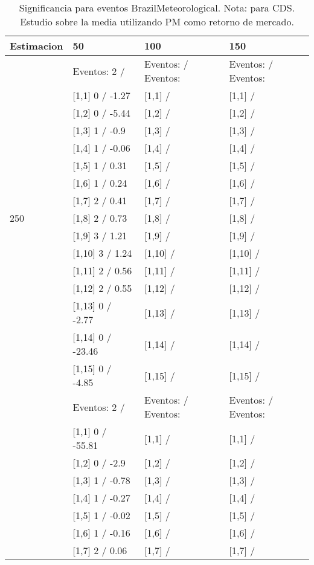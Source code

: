 \begin{table}

\caption{Significancia para eventos BrazilMeteorological. Nota: para CDS. Estudio sobre la media utilizando PM como retorno de mercado.}
\centering
\begin{tabular}[t]{llll}
\toprule
Estimacion & 50 & 100 & 150\\
\midrule
 & Eventos:  2 / & Eventos:   / Eventos: & Eventos:   / Eventos:\\
 & {}[1,1] 0  / -1.27 & {}[1,1]  / & {}[1,1]  /\\
 & {}[1,2] 0  / -5.44 & {}[1,2]  / & {}[1,2]  /\\
 & {}[1,3] 1  / -0.9 & {}[1,3]  / & {}[1,3]  /\\
 & {}[1,4] 1  / -0.06 & {}[1,4]  / & {}[1,4]  /\\
\addlinespace
 & {}[1,5] 1  / 0.31 & {}[1,5]  / & {}[1,5]  /\\
 & {}[1,6] 1  / 0.24 & {}[1,6]  / & {}[1,6]  /\\
 & {}[1,7] 2  / 0.41 & {}[1,7]  / & {}[1,7]  /\\
250 & {}[1,8] 2  / 0.73 & {}[1,8]  / & {}[1,8]  /\\
 & {}[1,9] 3  / 1.21 & {}[1,9]  / & {}[1,9]  /\\
\addlinespace
 & {}[1,10] 3  / 1.24 & {}[1,10]  / & {}[1,10]  /\\
 & {}[1,11] 2  / 0.56 & {}[1,11]  / & {}[1,11]  /\\
 & {}[1,12] 2  / 0.55 & {}[1,12]  / & {}[1,12]  /\\
 & {}[1,13] 0  / -2.77 & {}[1,13]  / & {}[1,13]  /\\
 & {}[1,14] 0  / -23.46 & {}[1,14]  / & {}[1,14]  /\\
\addlinespace
 & {}[1,15] 0  / -4.85 & {}[1,15]  / & {}[1,15]  /\\
 & Eventos:  2 / & Eventos:   / Eventos: & Eventos:   / Eventos:\\
 & {}[1,1] 0  / -55.81 & {}[1,1]  / & {}[1,1]  /\\
 & {}[1,2] 0  / -2.9 & {}[1,2]  / & {}[1,2]  /\\
 & {}[1,3] 1  / -0.78 & {}[1,3]  / & {}[1,3]  /\\
\addlinespace
 & {}[1,4] 1  / -0.27 & {}[1,4]  / & {}[1,4]  /\\
 & {}[1,5] 1  / -0.02 & {}[1,5]  / & {}[1,5]  /\\
 & {}[1,6] 1  / -0.16 & {}[1,6]  / & {}[1,6]  /\\
 & {}[1,7] 2  / 0.06 & {}[1,7]  / & {}[1,7]  /\\

\end{tabular}
\end{table}
